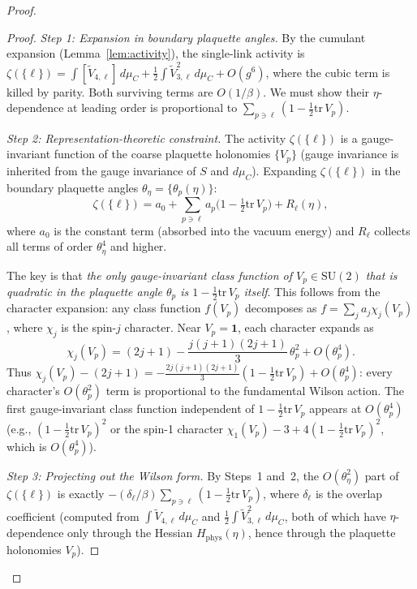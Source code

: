 \documentclass[11pt]{article}
\theoremstyle{definition}
\newcommand{\SU}{\mathrm{SU}}
\newcommand{\tr}{\mathrm{tr}}
\begin{document}
\begin{proof}
\begin{proof}
\emph{Step 1: Expansion in boundary plaquette angles.}
By the cumulant expansion (Lemma~\ref{lem:activity}), the
single-link activity is
$\zeta(\{\ell\})=\int[\widetilde{V}_{4,\ell}]\,d\mu_C
+\frac{1}{2}\int\widetilde{V}_{3,\ell}^2\,d\mu_C+O(g^6)$,
where the cubic term is killed by parity.  Both surviving
terms are $O(1/\beta)$.  We must show their $\eta$-dependence
at leading order is proportional to
$\sum_{p\ni\ell}(1-\frac{1}{2}\tr\,V_p)$.

\emph{Step 2: Representation-theoretic constraint.}
The activity $\zeta(\{\ell\})$ is a gauge-invariant function of
the coarse plaquette holonomies $\{V_p\}$ (gauge invariance is
inherited from the gauge invariance of $S$ and $d\mu_C$).
Expanding $\zeta(\{\ell\})$ in the boundary plaquette angles
$\theta_\eta=\{\theta_p(\eta)\}$:
\[
\zeta(\{\ell\})=a_0+\sum_{p\ni\ell}a_p
\bigl(1-\tfrac{1}{2}\tr\,V_p\bigr)+R_\ell(\eta),
\]
where $a_0$ is the constant term (absorbed into the vacuum energy)
and $R_\ell$ collects all terms of order $\theta_\eta^4$ and higher.

The key is that \emph{the only gauge-invariant class function
of $V_p\in\SU(2)$ that is quadratic in the plaquette angle
$\theta_p$ is $1-\frac{1}{2}\tr\,V_p$ itself}.  This follows
from the character expansion: any class function $f(V_p)$
decomposes as $f=\sum_j a_j\chi_j(V_p)$, where
$\chi_j$ is the spin-$j$ character.  Near
$V_p=\mathbf{1}$, each character expands as
\begin{equation}\label{eq:character-expansion}
\chi_j(V_p)=(2j+1)-\frac{j(j+1)(2j+1)}{3}\,\theta_p^2
+O(\theta_p^4).
\end{equation}
Thus $\chi_j(V_p)-(2j+1)=-\frac{2j(j+1)(2j+1)}{3}
(1-\frac{1}{2}\tr\,V_p)+O(\theta_p^4)$:
every character's $O(\theta_p^2)$ term is proportional to
the fundamental Wilson action.  The first gauge-invariant class
function independent of $1-\frac{1}{2}\tr\,V_p$ appears at
$O(\theta_p^4)$ (e.g.,
$(1-\frac{1}{2}\tr\,V_p)^2$ or the spin-1 character
$\chi_1(V_p)-3+4(1-\frac{1}{2}\tr\,V_p)^2$, which is
$O(\theta_p^4)$).

\emph{Step 3: Projecting out the Wilson form.}
By Steps~1 and~2, the $O(\theta_\eta^2)$ part of
$\zeta(\{\ell\})$ is exactly
$-(\delta_\ell/\beta)\sum_{p\ni\ell}(1-\frac{1}{2}\tr\,V_p)$,
where $\delta_\ell$ is the overlap coefficient (computed from
$\int\widetilde{V}_{4,\ell}\,d\mu_C$ and
$\frac{1}{2}\int\widetilde{V}_{3,\ell}^2\,d\mu_C$,
both of which have $\eta$-dependence only through the
Hessian $H_{\mathrm{phys}}(\eta)$, hence through the plaquette
holonomies $V_p$).


\end{proof}
\end{proof}
\end{document}
